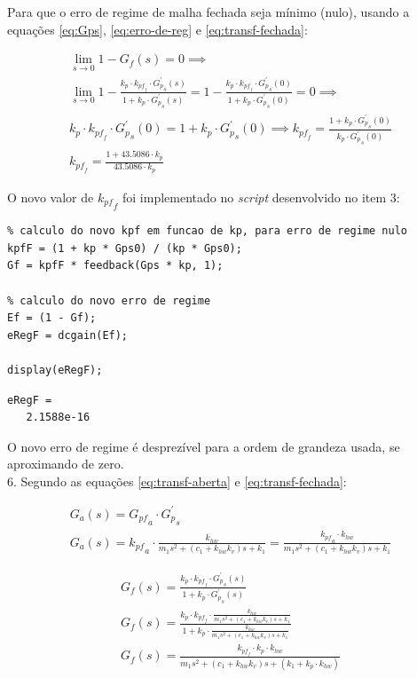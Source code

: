 \documentclass[a4paper,11pt]{article}
\begin{document}
Para que o erro de regime de malha fechada seja mínimo (nulo), usando a
equações \ref{eq:Gps}, \ref{eq:erro-de-reg} e \ref{eq:transf-fechada}:

\begin{gather*}
    \lim_{s\to0} 1 - G_f\left(s\right) = 0 \implies \\
    \lim_{s\to0} 1 - \frac{k_p \cdot k_{{pf}_f} \cdot
        {G^\prime_p}_s\left(s\right)}{1 + k_p \cdot
        {G^\prime_p}_s\left(s\right)} = 1 - \frac{k_p \cdot k_{{pf}_f} \cdot
        {G^\prime_p}_s\left(0\right)}{1 + k_p \cdot
        {G^\prime_p}_s\left(0\right)} = 0 \implies \\
    k_p \cdot k_{{pf}_f} \cdot {G^\prime_p}_s\left(0\right) =
        1 + k_p \cdot {G^\prime_p}_s\left(0\right) \implies
        k_{{pf}_f} = \frac{1 + k_p \cdot {G^\prime_p}_s\left(0\right)}
        {k_p \cdot {G^\prime_p}_s\left(0\right)} \\
    k_{{pf}_f} = \frac{1 + 43.5086 \cdot k_p}
        {43.5086 \cdot k_p}
\end{gather*}

O novo valor de ${k_{pf}}_f$ foi implementado no \textit{script} desenvolvido no
item 3:

\begin{lstlisting}
% calculo do novo kpf em funcao de kp, para erro de regime nulo
kpfF = (1 + kp * Gps0) / (kp * Gps0);
Gf = kpfF * feedback(Gps * kp, 1);

% calculo do novo erro de regime
Ef = (1 - Gf);
eRegF = dcgain(Ef);

display(eRegF);
\end{lstlisting}
\begin{lstlisting}
eRegF =
   2.1588e-16
\end{lstlisting}

O novo erro de regime é desprezível para a ordem de grandeza usada, se
aproximando de zero. \\

6. Segundo as equações \ref{eq:transf-aberta} e \ref{eq:transf-fechada}:

\begin{gather*}
    G_a\left(s\right) = {G_{pf}}_a \cdot {G^\prime_p}_s \\
    G_a\left(s\right) = {k_{pf}}_a \cdot \frac{k_{hw}}
        {m_1s^2 + \left(c_1 + k_{hw} k_v\right) s + k_1} =
        \frac{{k_{pf}}_a \cdot k_{hw}}
        {m_1s^2 + \left(c_1 + k_{hw} k_v\right) s + k_1}
\end{gather*}

\begin{gather*}
    G_f\left(s\right) =
        \frac{k_p \cdot k_{{pf}_f} \cdot {G^\prime_p}_s\left(s\right)}
        {1 + k_p \cdot {G^\prime_p}_s\left(s\right)} \\
    G_f\left(s\right) =
        \frac{k_p \cdot k_{{pf}_f} \cdot \frac{k_{hw}}
        {m_1s^2 + \left(c_1 + k_{hw} k_v\right) s + k_1}}
        {1 + k_p \cdot \frac{k_{hw}}
        {m_1s^2 + \left(c_1 + k_{hw} k_v\right) s + k_1}} \\
    G_f\left(s\right) =
        \frac{k_{{pf}_f} \cdot k_p \cdot k_{hw}}
        {m_1s^2 + \left(c_1 + k_{hw} k_v\right) s +
        \left(k_1 + k_p \cdot k_{hw}\right)}
\end{gather*}
\end{document}
